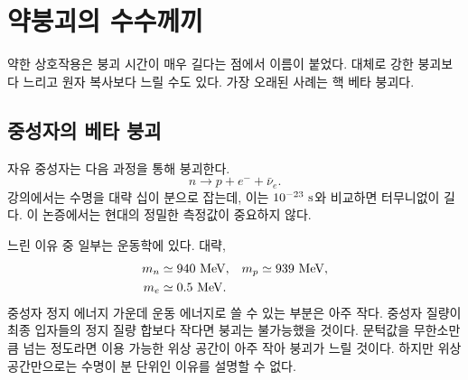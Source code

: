 \begin{classroomqa}\end{classroomqa}

\begin{classroomqa}\end{classroomqa}

\section{약붕괴의 수수께끼}

약한 상호작용은 붕괴 시간이 매우 길다는 점에서 이름이 붙었다. 대체로 강한 붕괴보다 느리고 원자 복사보다 느릴 수도 있다. 가장 오래된 사례는 핵 베타 붕괴다.

\subsection{중성자의 베타 붕괴}

자유 중성자는 다음 과정을 통해 붕괴한다.
\begin{equation}
n\longrightarrow p+e^-+\bar\nu_e.
\label{eq:l5-neutron-decay-intro}
\end{equation} 강의에서는 수명을 대략 십이 분으로 잡는데, 이는 \(10^{-23}\ {\rm s}\)와 비교하면 터무니없이 길다. 이 논증에서는 현대의 정밀한 측정값이 중요하지 않다.

느린 이유 중 일부는 운동학에 있다. 대략,
\begin{equation}
\begin{aligned}
m_n&\simeq940\ {\rm MeV},
&
m_p&\simeq939\ {\rm MeV},
\\
m_e&\simeq0.5\ {\rm MeV}.
\end{aligned}
\end{equation} 중성자 정지 에너지 가운데 운동 에너지로 쓸 수 있는 부분은 아주 작다. 중성자 질량이 최종 입자들의 정지 질량 합보다 작다면 붕괴는 불가능했을 것이다. 문턱값을 무한소만큼 넘는 정도라면 이용 가능한 위상 공간이 아주 작아 붕괴가 느릴 것이다. 하지만 위상 공간만으로는 수명이 분 단위인 이유를 설명할 수 없다.

